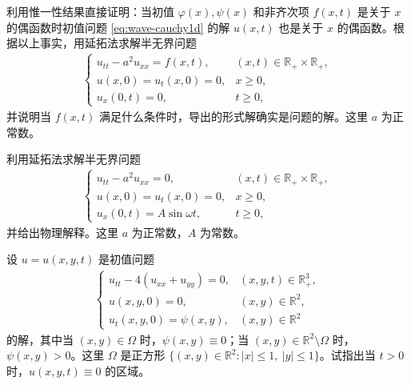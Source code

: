 \documentclass[../../main.tex]{subfiles}%
\begin{document}
\begin{example}
利用惟一性结果直接证明：当初值 $\varphi(x),\psi(x)$ 和非齐次项 $f(x,t)$ 是关于 $x$ 的偶函数时初值问题 \eqref{eq:wave-cauchy1d} 的解 $u(x,t)$ 也是关于 $x$ 的偶函数。根据以上事实，用延拓法求解半无界问题
\begin{align*}
\begin{cases}
u_{tt}-a^2u_{xx}=f(x,t), & (x,t)\in\mathbb{R}_+\times\mathbb{R}_+, \\
u(x,0)=u_t(x,0)=0, & x\geqslant 0, \\
u_x(0,t)=0, & t\geqslant 0,
\end{cases}
\end{align*}
并说明当 $f(x,t)$ 满足什么条件时，导出的形式解确实是问题的解。这里 $a$ 为正常数。
\end{example}

\begin{example}
利用延拓法求解半无界问题
\begin{align*}
\begin{cases}
u_{tt}-a^2u_{xx}=0, & (x,t)\in\mathbb{R}_+\times\mathbb{R}_+, \\
u(x,0)=u_t(x,0)=0, & x\geqslant 0, \\
u_x(0,t)=A\sin\omega t, & t\geqslant 0,
\end{cases}
\end{align*}
并给出物理解释。这里 $a$ 为正常数，$A$ 为常数。
\end{example}

\begin{example}
设 $u=u(x,y,t)$ 是初值问题
\begin{align*}
\begin{cases}
u_{tt}-4(u_{xx}+u_{yy})=0, & (x,y,t)\in\mathbb{R}_+^3, \\
u(x,y,0)=0, & (x,y)\in\mathbb{R}^2, \\
u_t(x,y,0)=\psi(x,y), & (x,y)\in\mathbb{R}^2
\end{cases}
\end{align*}
的解，其中当 $(x,y)\in\Omega$ 时，$\psi(x,y)\equiv 0$；当 $(x,y)\in\mathbb{R}^2\setminus\Omega$ 时，$\psi(x,y)>0$。这里 $\Omega$ 是正方形 $\{(x,y)\in\mathbb{R}^2: |x|\leqslant 1,\ |y|\leqslant 1\}$。试指出当 $t>0$ 时，$u(x,y,t)\equiv 0$ 的区域。
\end{example}
\end{document}
